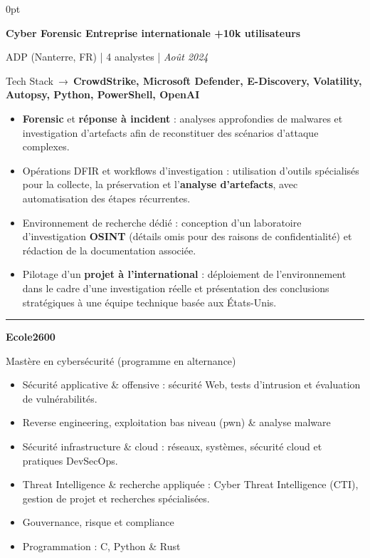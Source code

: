 \documentclass[9pt,a4paper]{extarticle}
\newlength{\labelcol}\setlength{\labelcol}{125.1pt}  %
\newcommand{\ruleweight}{0.75pt}
\newlength{\gRuleSection}  \setlength{\gRuleSection}  {1.9pt}
\newlength{\gTitleOrg}     \setlength{\gTitleOrg}     {2.0pt}
\newlength{\gOrgStack}     \setlength{\gOrgStack}     {2.5pt}
\newlength{\gStackItems}   \setlength{\gStackItems}   {6pt}
\newlength{\gJobJob}       \setlength{\gJobJob}       {10pt}
\newlength{\gItemsRule}    \setlength{\gItemsRule}    {2.9pt}
\newlength{\gSchoolDegree} \setlength{\gSchoolDegree} {3.6pt}
\newlength{\gDegreeItems}  \setlength{\gDegreeItems}  {4.0pt}
\newcommand{\sz}[2]{\fontsize{#1}{#2}\selectfont}
\newcommand{\flatbox}[1]{\raisebox{0pt}[0pt][0pt]{#1}}
\newcommand{\sidelabel}[1]{%
  \leavevmode
  \llap{\flatbox{\parbox[t]{\labelcol}{\raggedright\bfseries\sz{10}{13.5}#1}}}%
  \ignorespaces
}
\newcommand{\cvrule}{%
  \par\noindent\textcolor{ink}{\rule{\linewidth}{\ruleweight}}\par%
}
\newcommand{\bul}{\makebox[0pt][l]{\sz{10}{10}\textbullet}}
\newcommand{\arrow}{→}
\newcommand{\techstack}[1]{%
  {\sz{8}{11}Tech Stack\ \arrow\ \textbf{#1}\par}%
}
\newcommand{\job}[3]{%
  {\sz{10}{13.5}\bfseries\leavevmode #1\par}%
  \vspace{\gTitleOrg}%
  {\sz{8.9}{12}#2\par}%
  \vspace{\gOrgStack}%
  \techstack{#3}%
}
\newenvironment{cvitems}{%
  \vspace{\gStackItems}%
  \begin{itemize}[leftmargin=9.5pt, labelsep=11.6pt, labelwidth=0pt,
                  align=left, itemsep=0pt, topsep=0pt, parsep=0pt,
                  partopsep=0pt, label=\bul]%
  \sz{9}{12.5}%
}{\end{itemize}}
\newenvironment{cvsubitems}{%
  \vspace{\gDegreeItems}%
  \begin{itemize}[leftmargin=16pt, labelsep=11.5pt, labelwidth=0pt,
                  align=left, itemsep=0pt, topsep=0pt, parsep=0pt,
                  partopsep=0pt, label=\bul]%
  \sz{9}{12.5}%
}{\end{itemize}}
\begin{document}
\begin{adjustwidth}{}{0pt}
\vspace{\gJobJob}

\job{Cyber Forensic \textbullet{} Entreprise internationale \textbullet{} +10k utilisateurs}
    {ADP (Nanterre, FR) | 4 analystes | \textit{Août 2024}}
    {CrowdStrike, Microsoft Defender, E-Discovery, Volatility, Autopsy, Python, PowerShell, OpenAI}

\begin{cvitems}
  \item \textbf{Forensic} et \textbf{réponse à incident} : analyses approfondies de
        malwares et investigation d'artefacts afin de reconstituer des scénarios
        d'attaque complexes.
  \item Opérations DFIR et workflows d'investigation : utilisation d'outils spécialisés
        pour la collecte, la préservation et l'\textbf{analyse d'artefacts}, avec
        automatisation des étapes récurrentes.
  \item Environnement de recherche dédié : conception d'un laboratoire d'investigation
        \textbf{OSINT} (détails omis pour des raisons de confidentialité) et rédaction
        de la documentation associée.
  \item Pilotage d'un \textbf{projet à l'international} : déploiement de
        l'environnement dans le cadre d'une investigation réelle et présentation des
        conclusions stratégiques à une équipe technique basée aux États-Unis.
\end{cvitems}

\vspace{\gItemsRule}
\cvrule
\vspace{\gRuleSection}

\sidelabel{FORMATION}%
{\sz{10}{13.5}\bfseries\leavevmode Ecole2600\par}
\vspace{\gSchoolDegree}
{\sz{9.76}{13}Mastère en cybersécurité (programme en alternance)\par}

\begin{cvsubitems}
  \item Sécurité applicative \& offensive : sécurité Web, tests d'intrusion et
        évaluation de vulnérabilités.
  \item Reverse engineering, exploitation bas niveau (pwn) \& analyse malware
  \item Sécurité infrastructure \& cloud : réseaux, systèmes, sécurité cloud et
        pratiques DevSecOps.
  \item Threat Intelligence \& recherche appliquée : Cyber Threat Intelligence (CTI),
        gestion de projet et recherches spécialisées.
  \item Gouvernance, risque et compliance
  \item Programmation : C, Python \& Rust
\end{cvsubitems}


\end{adjustwidth}
\end{document}
